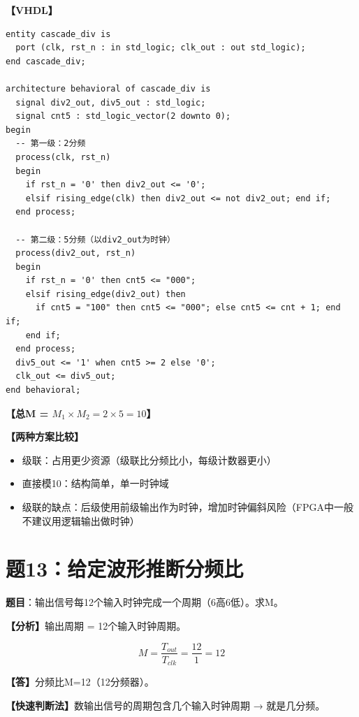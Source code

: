 \begin{solution}[完整解答]

\textbf{【VHDL】}
\begin{lstlisting}
entity cascade_div is
  port (clk, rst_n : in std_logic; clk_out : out std_logic);
end cascade_div;

architecture behavioral of cascade_div is
  signal div2_out, div5_out : std_logic;
  signal cnt5 : std_logic_vector(2 downto 0);
begin
  -- 第一级：2分频
  process(clk, rst_n)
  begin
    if rst_n = '0' then div2_out <= '0';
    elsif rising_edge(clk) then div2_out <= not div2_out; end if;
  end process;

  -- 第二级：5分频（以div2_out为时钟）
  process(div2_out, rst_n)
  begin
    if rst_n = '0' then cnt5 <= "000";
    elsif rising_edge(div2_out) then
      if cnt5 = "100" then cnt5 <= "000"; else cnt5 <= cnt + 1; end if;
    end if;
  end process;
  div5_out <= '1' when cnt5 >= 2 else '0';
  clk_out <= div5_out;
end behavioral;
\end{lstlisting}

\textbf{【总M = $M_1 \times M_2 = 2 \times 5 = 10$】}

\textbf{【两种方案比较】}
\begin{itemize}
  \item 级联：占用更少资源（级联比分频比小，每级计数器更小）
  \item 直接模10：结构简单，单一时钟域
  \item 级联的缺点：后级使用前级输出作为时钟，增加时钟偏斜风险（FPGA中一般不建议用逻辑输出做时钟）
\end{itemize}

\end{solution}


\section{题13：给定波形推断分频比}

\textbf{题目}：输出信号每12个输入时钟完成一个周期（6高6低）。求M。

\begin{solution}[完整解答]

\textbf{【分析】}输出周期 = 12个输入时钟周期。

$$M = \frac{T_{out}}{T_{clk}} = \frac{12}{1} = 12$$

\textbf{【答】}分频比M=12（12分频器）。

\textbf{【快速判断法】}数输出信号的周期包含几个输入时钟周期 → 就是几分频。

\end{solution}


